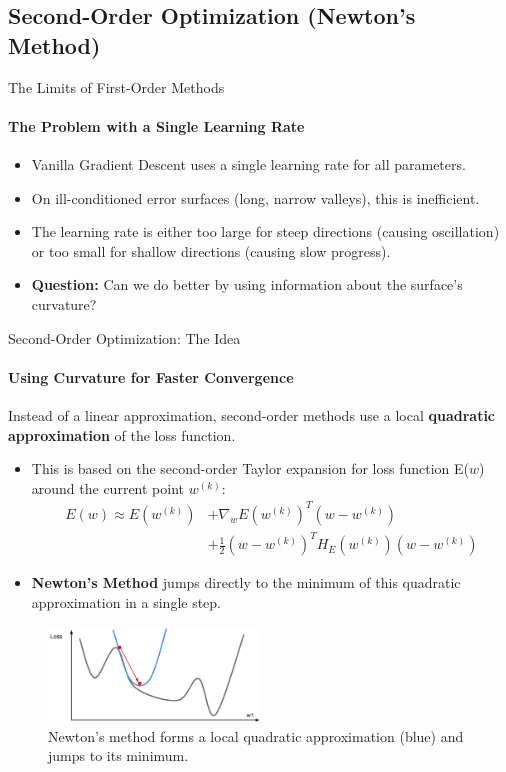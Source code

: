\subsection{Second-Order Optimization (Newton's Method)}

\begin{frame}{The Limits of First-Order Methods}
    \framesubtitle{The Problem with a Single Learning Rate}
    \begin{itemize}
        \item Vanilla Gradient Descent uses a single learning rate for all parameters.
        \item On ill-conditioned error surfaces (long, narrow valleys), this is inefficient.
        \item The learning rate is either too large for steep directions (causing oscillation) or too small for shallow directions (causing slow progress).
        \item \textbf{Question:} Can we do better by using information about the surface's curvature?
    \end{itemize}
\end{frame}

\begin{frame}{Second-Order Optimization: The Idea}
    \framesubtitle{Using Curvature for Faster Convergence}
    Instead of a linear approximation, second-order methods use a local \textbf{quadratic approximation} of the loss function.
    \begin{itemize}
        \item This is based on the second-order Taylor expansion for loss function E($w$) around the current point $w^{(k)}$:
        \begin{equation*}
        \begin{split}
            E(w) \approx E(w^{(k)}) &+ \nabla_{w}E(w^{(k)})^{T}(w-w^{(k)}) \\
            &+ \frac{1}{2}(w-w^{(k)})^{T}H_{E}(w^{(k)})(w-w^{(k)})
        \end{split}
        \end{equation*}
        \item \textbf{Newton's Method} jumps directly to the minimum of this quadratic approximation in a single step.
    \end{itemize}
    \begin{figure}
        \includegraphics[width=0.5\textwidth]{images/secondmethods.png}
        \caption{Newton's method forms a local quadratic approximation (blue) and jumps to its minimum.}
    \end{figure}
\end{frame}

